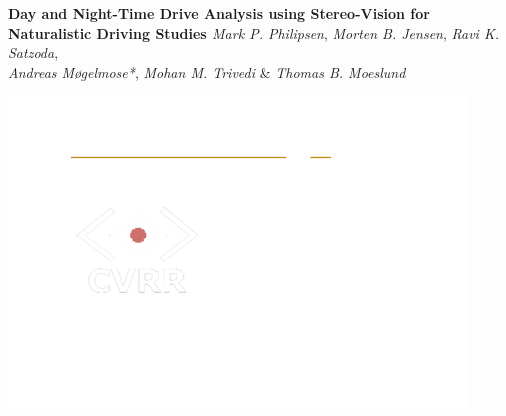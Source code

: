 \documentclass[paperwidth=90cm,paperheight=130cm,landscape,12pt]{preambles/baposter}
\begin{document}
\begin{poster}
{ 
}
{\color{white}\bf
 \LARGE{
  Day and Night-Time Drive Analysis using Stereo-Vision for Naturalistic Driving Studies %
 }
}
{\color{white}\large
  \vspace{0.7em} \textit{Mark P. Philipsen}, \textit{Morten B. Jensen}, \textit{Ravi K. Satzoda},\\ \textit{Andreas Møgelmose*}, \textit{Mohan M. Trivedi} \& \textit{Thomas B. Moeslund} %
}
{
  \includegraphics[height=0.75\headerheight]{preambles/all.png}
%
%
%
%  



}
\end{poster}
\end{document}
